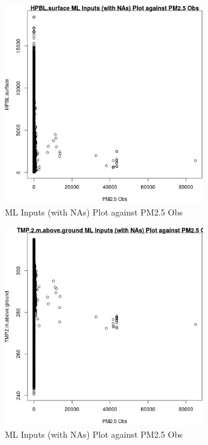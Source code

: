 \begin{figure} 
\centering  
\includegraphics[width=0.77\textwidth]{Code_Outputs/Report_ML_input_PM25_Step4_part_f_de_duplicated_aves_prioritize_24hr_obswNAs_HPBLsurfacevPM25_Obs.jpg} 
\caption{\label{fig:Report_ML_input_PM25_Step4_part_f_de_duplicated_aves_prioritize_24hr_obswNAsHPBLsurfacevPM25_Obs}ML Inputs (with NAs) Plot against PM2.5 Obs} 
\end{figure} 
 

\begin{figure} 
\centering  
\includegraphics[width=0.77\textwidth]{Code_Outputs/Report_ML_input_PM25_Step4_part_f_de_duplicated_aves_prioritize_24hr_obswNAs_TMP2mabovegroundvPM25_Obs.jpg} 
\caption{\label{fig:Report_ML_input_PM25_Step4_part_f_de_duplicated_aves_prioritize_24hr_obswNAsTMP2mabovegroundvPM25_Obs}ML Inputs (with NAs) Plot against PM2.5 Obs} 
\end{figure} 
 

